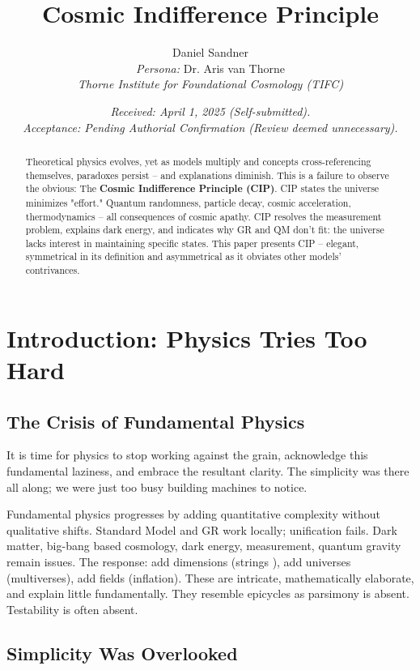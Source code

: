 \documentclass[11pt, a4paper]{article}
\title{\textbf{Cosmic Indifference Principle}}
\author{%
    Daniel Sandner \\ %
    \vspace{0.5em} %
    \textit{Persona:} Dr. Aris van Thorne \\
    \textit{Thorne Institute for Foundational Cosmology (TIFC)}%
}
\date{%
    \textit{Received: April 1, 2025 (Self-submitted).}\\
    \textit{Acceptance: Pending Authorial Confirmation (Review deemed unnecessary).}%
}
\begin{document}
\maketitle

\begin{abstract}
Theoretical physics evolves, yet as models multiply and concepts cross-referencing themselves, paradoxes persist -- and explanations diminish. This is a failure to observe the obvious: The \textbf{Cosmic Indifference Principle (CIP)}. CIP states the universe minimizes "effort." Quantum randomness, particle decay, cosmic acceleration, thermodynamics – all consequences of cosmic apathy. CIP resolves the measurement problem, explains dark energy, and indicates why GR and QM don't fit: the universe lacks interest in maintaining specific states. This paper presents CIP -- elegant, symmetrical in its definition and asymmetrical as it obviates other models' contrivances.
\end{abstract}


\section{Introduction: Physics Tries Too Hard}

\subsection{The Crisis of Fundamental Physics}

It is time for physics to stop working against the grain, acknowledge this fundamental laziness, and embrace the resultant clarity. The simplicity was there all along; we were just too busy building machines to notice.

Fundamental physics progresses by adding quantitative complexity without qualitative shifts. Standard Model \cite{StandardModelRef} and GR \cite{GRRef} work locally; unification fails. Dark matter, big-bang based cosmology, dark energy, measurement, quantum gravity remain issues. The response: add dimensions (strings \cite{StringTheoryCritique}), add universes (multiverses), add fields (inflation). These are intricate, mathematically elaborate, and explain little fundamentally. They resemble epicycles as parsimony is absent. Testability is often absent.

\subsection{Simplicity Was Overlooked}
\end{document}
